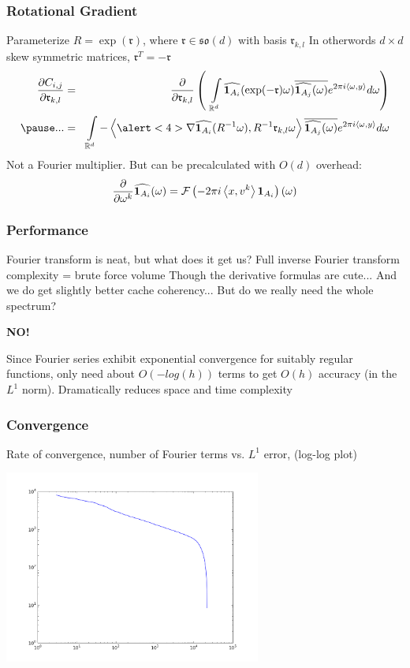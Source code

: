 \documentclass{beamer}
\begin{document}
\begin{frame}
\frametitle{Rotational Gradient}
\newcommand{\rr}{\mathfrak{r}}
Parameterize $R = \exp( \mathfrak{r} )$, where $\rr \in \mathfrak{so}(d)$ with basis $\rr_{k,l}$ \vskip2pt
\hskip5pt{\small In otherwords $d \times d$ skew symmetric matrices, $\rr^T = -\rr$}
\pause
\begin{eqnarray*}
\frac{\partial C_{i,j}}{\partial \rr_{k,l}}  
& = &
 \frac{ \partial }{ \partial \rr_{k,l} } \left( \:\: 
	\int \limits_{\R^d} 
		\widehat{\ind{A_i}}(\exp(-\rr) \omega) 
		\overline{\widehat{\ind{A_j}}(\omega)} 
		e^{2 \pi i \inner{\omega}{y}} 
	d \omega
\right )\\
\pause
...
& = &
	\int \limits_{\R^d} 
		-\inner{ \alert<4>{\nabla \widehat{\ind{A_i}}(R^{-1} \omega)} }{ R^{-1} \rr_{k,l} \omega } \overline{\widehat{\ind{A_j}}(\omega)} e^{2 \pi i \inner{\omega}{y}} d \omega
\end{eqnarray*}
\pause
Not a Fourier multiplier.
\vskip5pt
\pause
But can be precalculated with $O(d)$ overhead:
\vskip5pt
\[ \frac{\partial}{\partial \omega^k} \widehat{{\bf 1}_{A_i}}(\omega) = \mathcal{F}\left( -2 \pi i \left \langle x , v^k \right \rangle {\bf 1}_{A_i}\right)(\omega) \]
\end{frame}

\begin{frame}
\frametitle{Performance}
Fourier transform is neat, but what does it get us?
\vskip10pt
\pause
Full inverse Fourier transform complexity = brute force volume
\vskip2pt
\hskip10pt {\small Though the derivative formulas are cute...}
\vskip2pt
\hskip10pt {\small And we do get slightly better cache coherency...}
\vskip10pt
\pause
But do we really need the whole spectrum?
\pause
\vskip15pt
\begin{center}
\alert{\bf {\Huge NO!}}
\end{center}
\pause
\vskip15pt
Since Fourier series exhibit exponential convergence for suitably regular functions, only need about $O(-log(h))$ terms to get $O(h)$ accuracy (in the $L^1$ norm).
\vskip10pt
\pause
Dramatically reduces space and time complexity
\end{frame}

\begin{frame}
\frametitle{Convergence}
Rate of convergence, number of Fourier terms vs. $L^1$ error, (log-log plot)
\begin{center}
\includegraphics[height=2.5in]{figures/trunc_errors.png}
\end{center}
\end{frame}
\end{document}
